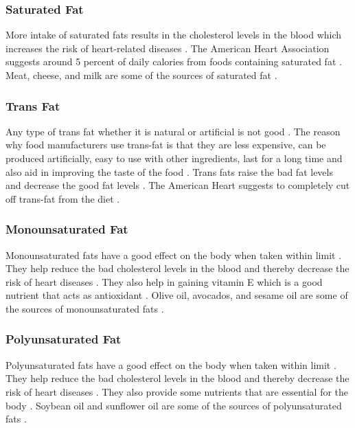 \documentclass[sigconf]{acmart}
\begin{document}
\subsubsection{Saturated Fat}
More intake of saturated fats results in the cholesterol levels in the blood which increases the risk of heart-related diseases \cite{www-health}. The American Heart Association suggests around 5 percent of daily calories from foods containing saturated fat \cite{www-health}. Meat, cheese, and milk are some of the sources of saturated fat \cite{www-health}. 

\subsubsection{Trans Fat}
Any type of trans fat whether it is natural or artificial is not good \cite{www-health}. The reason why food manufacturers use trans-fat is that they are less expensive, can be produced artificially, easy to use with other ingredients, last for a long time and also aid in improving the taste of the food \cite{www-health}. Trans fats raise the bad fat levels and decrease the good fat levels \cite{www-health}. The American Heart suggests to completely cut off trans-fat from the diet \cite{www-health}.

\subsubsection{Monounsaturated Fat}
Monounsaturated fats have a good effect on the body when taken within limit \cite{www-health}. They help reduce the bad cholesterol levels in the blood and thereby decrease the risk of heart diseases \cite{www-health}. They also help in gaining vitamin E which is a good nutrient that acts as antioxidant \cite{www-health}. Olive oil, avocados, and sesame oil are some of the sources of monounsaturated fats \cite{www-health}.

\subsubsection{Polyunsaturated Fat}
Polyunsaturated fats have a good effect on the body when taken within limit \cite{www-health}. They help reduce the bad cholesterol levels in the blood and thereby decrease the risk of heart diseases \cite{www-health}. They also provide some nutrients that are essential for the body \cite{www-health}. Soybean oil and sunflower oil are some of the sources of polyunsaturated fats \cite{www-health}.
\end{document}
